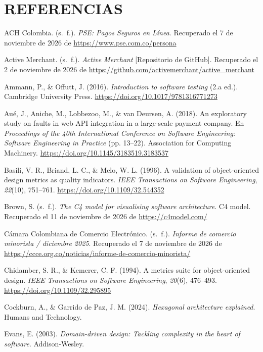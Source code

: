 \section{REFERENCIAS}

\begingroup\sloppy
\setlength{\parindent}{-1.5em}
\setlength{\leftskip}{1.5em}
\setlength{\parskip}{0.6em}

\noindent ACH Colombia. (s.~f.). \textit{PSE: Pagos Seguros en Línea}. Recuperado el 7 de noviembre de 2026 de \url{https://www.pse.com.co/persona}

\noindent Active Merchant. (s.~f.). \textit{Active Merchant} [Repositorio de GitHub]. Recuperado el 2 de noviembre de 2026 de \url{https://github.com/activemerchant/active_merchant}

\noindent Ammann, P., \& Offutt, J. (2016). \textit{Introduction to software testing} (2.a ed.). Cambridge University Press. \url{https://doi.org/10.1017/9781316771273}

\noindent Aué, J., Aniche, M., Lobbezoo, M., \& van Deursen, A. (2018). An exploratory study on faults in web API integration in a large-scale payment company. En \textit{Proceedings of the 40th International Conference on Software Engineering: Software Engineering in Practice} (pp. 13--22). Association for Computing Machinery. \url{https://doi.org/10.1145/3183519.3183537}

\noindent Basili, V. R., Briand, L. C., \& Melo, W. L. (1996). A validation of object-oriented design metrics as quality indicators. \textit{IEEE Transactions on Software Engineering}, \textit{22}(10), 751--761. \url{https://doi.org/10.1109/32.544352}

\noindent Brown, S. (s.~f.). \textit{The C4 model for visualising software architecture}. C4 model. Recuperado el 11 de noviembre de 2026 de \url{https://c4model.com/}

\noindent Cámara Colombiana de Comercio Electrónico. (s.~f.). \textit{Informe de comercio minorista / diciembre 2025}. Recuperado el 7 de noviembre de 2026 de \url{https://ccce.org.co/noticias/informe-de-comercio-minorista/}

\noindent Chidamber, S. R., \& Kemerer, C. F. (1994). A metrics suite for object-oriented design. \textit{IEEE Transactions on Software Engineering}, \textit{20}(6), 476--493. \url{https://doi.org/10.1109/32.295895}

\noindent Cockburn, A., \& Garrido de Paz, J. M. (2024). \textit{Hexagonal architecture explained}. Humans and Technology.

\noindent Evans, E. (2003). \textit{Domain-driven design: Tackling complexity in the heart of software}. Addison-Wesley.

